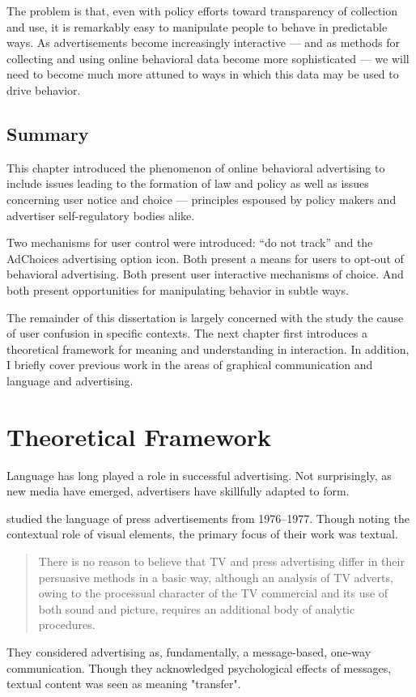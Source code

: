 The problem is that, even with policy efforts toward transparency of collection and use, it is remarkably easy to manipulate people to behave in predictable ways. As advertisements become increasingly interactive --- and as methods for collecting and using online behavioral data become more sophisticated --- we will need to become much more attuned to ways in which this data may be used to drive behavior. 

\section{Summary}
\label{summary}

This chapter introduced the phenomenon of online behavioral advertising to include issues leading to the formation of law and policy as well as issues concerning user notice and choice --- principles espoused by policy makers and advertiser self-regulatory bodies alike. 

Two mechanisms for user control were introduced: ``do not track'' and the AdChoices advertising option icon. Both present a means for users to opt-out of behavioral advertising. Both present user interactive mechanisms of choice. And both present opportunities for manipulating behavior in subtle ways.

The remainder of this dissertation is largely concerned with the study the cause of user confusion in specific contexts. The next chapter first introduces a theoretical framework for meaning and understanding in interaction. In addition, I briefly cover previous work in the areas of graphical communication and language and advertising.

\chapter{Theoretical Framework}
\label{theoreticalframework}

Language has long played a role in successful advertising. Not surprisingly, as new media have emerged, advertisers have skillfully adapted to form. 

 \cite{Vestergaard:1985vna}  studied the language of press advertisements from 1976--1977. Though noting the contextual role of visual elements, the primary focus of their work was textual.

\begin{quote}
There is no reason to believe that TV and press advertising differ in their persuasive methods in a basic way, although an analysis of TV adverts, owing to the processual character of the TV commercial and its use of both sound and picture, requires an additional body of analytic procedures. \cite[p. 10]{Vestergaard:1985vna}
\end{quote}
\begin{sloppier}
They considered advertising as, fundamentally, a message-based, one-way communication. Though they acknowledged psychological effects of messages, textual content was seen as meaning "transfer".
\end{sloppier}

